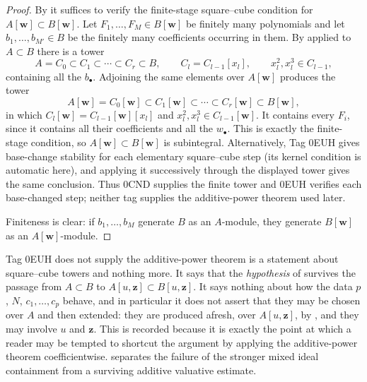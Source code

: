 \begin{proof}
By  it suffices to verify the finite-stage
square--cube condition for $A[\mathbf w]\subset B[\mathbf w]$.  Let
$F_1,\ldots,F_M\in B[\mathbf w]$ be finitely many polynomials and let
$b_1,\ldots,b_{M'}\in B$ be the finitely many coefficients occurring in
them.  By  applied to $A\subset B$ there is a
tower
\[
 A=C_0\subset C_1\subset\cdots\subset C_r\subset B,
 \qquad
 C_l=C_{l-1}[x_l],
 \qquad
 x_l^2,x_l^3\in C_{l-1},
\]
containing all the $b_\bullet$.  Adjoining the same elements over
$A[\mathbf w]$ produces the tower
\[
 A[\mathbf w]=C_0[\mathbf w]\subset C_1[\mathbf w]\subset\cdots
 \subset C_r[\mathbf w]\subset B[\mathbf w],
\]
in which $C_l[\mathbf w]=C_{l-1}[\mathbf w][x_l]$ and
$x_l^2,x_l^3\in C_{l-1}[\mathbf w]$.  It contains every $F_i$, since it
contains all their coefficients and all the $w_\bullet$.  This is exactly
the finite-stage condition, so $A[\mathbf w]\subset B[\mathbf w]$ is
subintegral.  Alternatively, Tag 0EUH gives base-change stability for each
elementary square--cube step (its kernel condition is automatic here), and
applying it successively through the displayed tower gives the same
conclusion.  Thus 0CND supplies the finite tower and 0EUH verifies each
base-changed step; neither tag supplies the additive-power theorem used
later.

Finiteness is clear: if $b_1,\ldots,b_M$ generate $B$ as an
$A$-module, they generate $B[\mathbf w]$ as an
$A[\mathbf w]$-module.
\end{proof}

\begin{warning}{Tag 0EUH does not supply the additive-power theorem}
\label{warn:ch44-tags-scope}
 is a statement about square--cube
towers and nothing more.  It says that the \emph{hypothesis} of
 survives the passage from $A\subset B$ to
$A[u,\mathbf z]\subset B[u,\mathbf z]$.  It says nothing about how the
data $p$, $N$, $c_1,\ldots,c_p$ behave, and in particular it does not
assert that they may be chosen over $A$ and then extended: they are
produced afresh, over $A[u,\mathbf z]$, by
, and they may involve $u$ and $\mathbf z$.  This is recorded because it is exactly the point at which a
reader may be tempted to shortcut the argument by applying the additive-power
theorem coefficientwise.   separates
the failure of the stronger mixed ideal containment from a surviving
additive valuative estimate.
\end{warning}

